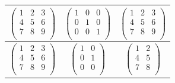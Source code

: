 \begin{table}[h!]
\begin{tabular}{||c|c|c||}
        \hline
        $\begin{pmatrix}
            1 & 2 & 3\\
            4 & 5 & 6\\
            7 & 8 & 9\\
        \end{pmatrix}$ 
        &  
        $\begin{pmatrix}
            1 & 0 & 0\\
            0 & 1 & 0\\
            0 & 0 & 1\\
        \end{pmatrix}$
        &
        $\begin{pmatrix}
            1 & 2 & 3\\
            4 & 5 & 6\\
            7 & 8 & 9\\
        \end{pmatrix}$ \\
        \hline
        $\begin{pmatrix}
            1 & 2 & 3\\
            4 & 5 & 6\\
            7 & 8 & 9\\
        \end{pmatrix}$ 
        &  
        $\begin{pmatrix}
            1 & 0\\
            0 & 1\\
            0 & 0\\
        \end{pmatrix}$
        &
        $\begin{pmatrix}
            1 & 2 \\
            4 & 5 \\
            7 & 8 \\
        \end{pmatrix}$ \\
        \hline
        \end{tabular}
\end{table}

